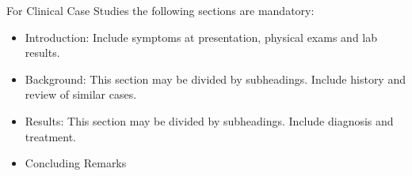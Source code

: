 For Clinical Case Studies the following sections are mandatory:

\begin{itemize}
\item Introduction: Include symptoms at presentation, physical exams and lab results.
\item Background: This section may be divided by subheadings. Include history and review of similar cases.
\item Results: This section may be divided by subheadings. Include diagnosis and treatment.
\item Concluding Remarks
\end{itemize}

